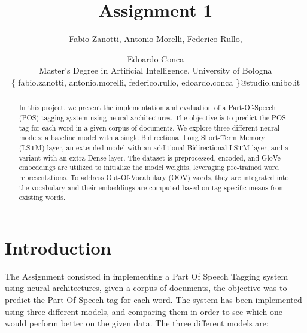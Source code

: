 \documentclass[11pt]{article}
\begin{document}
%
\title{Assignment 1\\
}
\author{Fabio Zanotti,
Antonio Morelli,
Federico Rullo,
\and
Edoardo Conca\\
Master's Degree in Artificial Intelligence, University of Bologna\\
\{ fabio.zanotti, antonio.morelli, federico.rullo, edoardo.conca \}@studio.unibo.it
}
\maketitle

\begin{abstract}


In this project, we present the implementation and evaluation of a Part-Of-Speech (POS) tagging system using neural architectures. The objective is to predict the POS tag for each word in a given corpus of documents. We explore three different neural models: a baseline model with a single Bidirectional Long Short-Term Memory (LSTM) layer, an extended model with an additional Bidirectional LSTM layer, and a variant with an extra Dense layer. The dataset is preprocessed, encoded, and GloVe embeddings are utilized to initialize the model weights, leveraging pre-trained word representations. To address Out-Of-Vocabulary (OOV) words, they are integrated into the vocabulary and their embeddings are computed based on tag-specific means from existing words. 

\end{abstract}

\section{Introduction}
\label{sec:introduction}

The Assignment consisted in implementing a Part Of Speech Tagging system using neural architectures, given a corpus of documents, the objective was to predict the Part Of Speech tag for each word.
The system has been implemented using three different models, and comparing them in order to see which one would perform better on the given data.
The three different models are:
\end{document}
